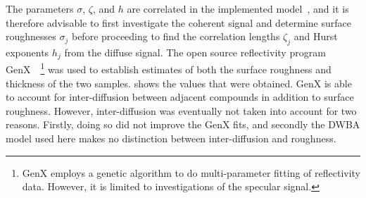 \documentclass[10pt,twoside, b5paper,pdftex]{report}
\begin{document}
The parameters $\sigma$, $\zeta$, and $h$ are correlated in the implemented model~\cite{HOLY}, and it is therefore advisable to first investigate the coherent signal and determine surface roughnesses $\sigma_j$ before proceeding to find the correlation lengths $\zeta_j$ and  Hurst exponents  $h_j$ from the diffuse signal. The open source reflectivity program GenX~\cite{BJORCK}~\footnote{GenX employs a genetic algorithm to do multi-parameter fitting of reflectivity data. However, it is limited to investigations of the specular signal.} was used to establish estimates of both the surface roughness and thickness of the two samples.  shows the values that were obtained. GenX is able to account for inter-diffusion between adjacent compounds in addition to surface roughness. However, inter-diffusion was eventually not taken into account for two reasons. Firstly, doing so did not improve the GenX fits, and secondly the DWBA model used here makes no distinction between inter-diffusion and roughness.
\end{document}
